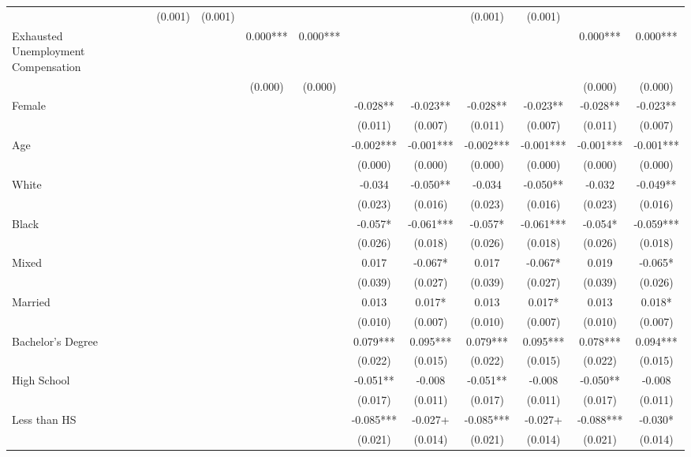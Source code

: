 \documentclass[
]{article}
\begin{document}
\begin{table}[t]
\begin{tabular*}{\linewidth}{@{\extracolsep{\fill}}lcccccccccccc}
 &  &  & (0.001) & (0.001) &  &  &  &  & (0.001) & (0.001) &  &  \\ 
Exhausted Unemployment Compensation &  &  &  &  & 0.000*** & 0.000*** &  &  &  &  & 0.000*** & 0.000*** \\ 
 &  &  &  &  & (0.000) & (0.000) &  &  &  &  & (0.000) & (0.000) \\ 
Female &  &  &  &  &  &  & -0.028** & -0.023** & -0.028** & -0.023** & -0.028** & -0.023** \\ 
 &  &  &  &  &  &  & (0.011) & (0.007) & (0.011) & (0.007) & (0.011) & (0.007) \\ 
Age &  &  &  &  &  &  & -0.002*** & -0.001*** & -0.002*** & -0.001*** & -0.001*** & -0.001*** \\ 
 &  &  &  &  &  &  & (0.000) & (0.000) & (0.000) & (0.000) & (0.000) & (0.000) \\ 
White &  &  &  &  &  &  & -0.034 & -0.050** & -0.034 & -0.050** & -0.032 & -0.049** \\ 
 &  &  &  &  &  &  & (0.023) & (0.016) & (0.023) & (0.016) & (0.023) & (0.016) \\ 
Black &  &  &  &  &  &  & -0.057* & -0.061*** & -0.057* & -0.061*** & -0.054* & -0.059*** \\ 
 &  &  &  &  &  &  & (0.026) & (0.018) & (0.026) & (0.018) & (0.026) & (0.018) \\ 
Mixed &  &  &  &  &  &  & 0.017 & -0.067* & 0.017 & -0.067* & 0.019 & -0.065* \\ 
 &  &  &  &  &  &  & (0.039) & (0.027) & (0.039) & (0.027) & (0.039) & (0.026) \\ 
Married &  &  &  &  &  &  & 0.013 & 0.017* & 0.013 & 0.017* & 0.013 & 0.018* \\ 
 &  &  &  &  &  &  & (0.010) & (0.007) & (0.010) & (0.007) & (0.010) & (0.007) \\ 
Bachelor's Degree &  &  &  &  &  &  & 0.079*** & 0.095*** & 0.079*** & 0.095*** & 0.078*** & 0.094*** \\ 
 &  &  &  &  &  &  & (0.022) & (0.015) & (0.022) & (0.015) & (0.022) & (0.015) \\ 
High School &  &  &  &  &  &  & -0.051** & -0.008 & -0.051** & -0.008 & -0.050** & -0.008 \\ 
 &  &  &  &  &  &  & (0.017) & (0.011) & (0.017) & (0.011) & (0.017) & (0.011) \\ 
Less than HS &  &  &  &  &  &  & -0.085*** & -0.027+ & -0.085*** & -0.027+ & -0.088*** & -0.030* \\ 
 &  &  &  &  &  &  & (0.021) & (0.014) & (0.021) & (0.014) & (0.021) & (0.014) \\ 

\end{tabular*}
\end{table}
\end{document}
